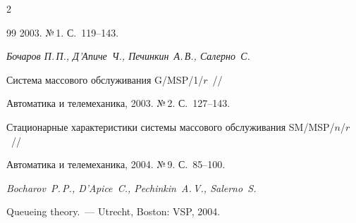 \begin{multicols}{2}
{{\begin{thebibliography}{99}
2003. №\,1. С.~119--143.







\textit{Бочаров П.\,П., Д'Апиче~Ч., Печинкин~А.\,В., Салерно~С.}


Система массового обслуживания G/MSP/1/$r$~//


Автоматика и телемеханика, 2003. №\,2. С.~127--143.









Стационарные характеристики системы массового обслуживания SM/MSP/$n$/$r$~//


Автоматика и телемеханика, 2004. №\,9. С.~85--100.










\textit{Bocharov~P.\,P., D'Apice~C., Pechinkin~A.\,V., Salerno~S.}


Queueing theory.~--- Utrecht, Boston: VSP, 2004.





\end{thebibliography}


}


}


\end{multicols}


